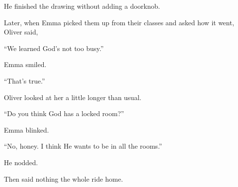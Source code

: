 He finished the drawing without adding a doorknob.

Later, when Emma picked them up from their classes and asked how it went, Oliver said,

``We learned God’s not too busy.''

Emma smiled.

``That’s true.''

Oliver looked at her a little longer than usual.

``Do you think God has a locked room?''

Emma blinked.

``No, honey. I think He wants to be in all the rooms.''

He nodded.

Then said nothing the whole ride home.

\medskip

